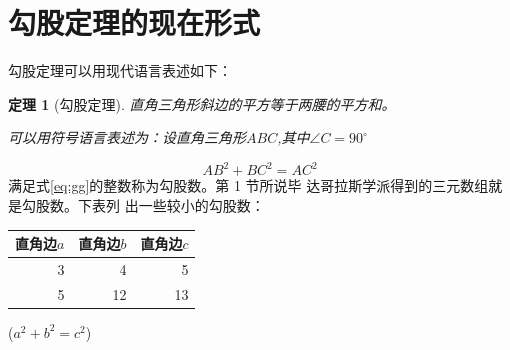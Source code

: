 \documentclass[UTF8]{ctexart}
\newtheorem{thm}{定理}
\begin{document}
\section{勾股定理的现在形式}
勾股定理可以用现代语言表述如下：
    \begin{thm}[勾股定理]
        直角三角形斜边的平方等于两腰的平方和。

可以用符号语言表述为：设直角三角形$ABC$,其中$\angle C=90^\circ$


    \end{thm}
    \begin{equation}
        AB^2+BC^2=AC^2
        \label{eq:gg}
    \end{equation}
    满足式\eqref{eq:gg}的整数称为勾股数。第 1 节所说毕
    达哥拉斯学派得到的三元数组就是勾股数。下表列
    出一些较小的勾股数：
    \begin{table}[H]  
        \begin{tabular}{|rrr|}
            \hline
            直角边$a$ & 直角边$b$ & 直角边$c$\\
            \hline
            3 & 4 & 5 \\
            5 & 12 & 13 \\
            \hline
        \end{tabular}%
        \qquad
        ($a^2+b^2=c^2$)    
    \end{table}
    
\end{document}
